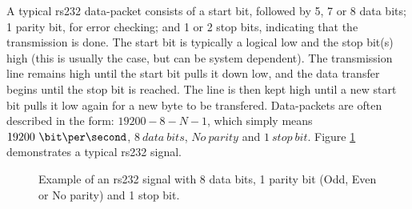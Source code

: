 \documentclass[main.tex]{subfiles}
\begin{document}
A typical \acrshort{rs232} data-packet consists of a start bit, followed by 5, 7 or 8 data bits; 1 parity bit, for error checking; and 1 or 2 stop bits, indicating that the transmission is done. The start bit is typically a logical low and the stop bit(s) high (this is usually the case, but can be system dependent). The transmission line remains high until the start bit pulls it down low, and the data transfer begins until the stop bit is reached. The line is then kept high until a new start bit pulls it low again for a new byte to be transfered. Data-packets are often described in the form: $19200-8-N-1$, which simply means $19200~ \bit\per\second$, $8~ data~ bits$, $No~ parity$ and $1~ stop~ bit$. Figure \ref{fig:rs232} demonstrates a typical \acrshort{rs232} signal.\\

\begin{figure}[!h]
\begin{center}

\caption{Example of an \acrshort{rs232} signal with 8 data bits, 1 parity bit (Odd, Even or No parity) and 1 stop bit.}
\label{fig:rs232}

\end{center}
\end{figure}
\end{document}
